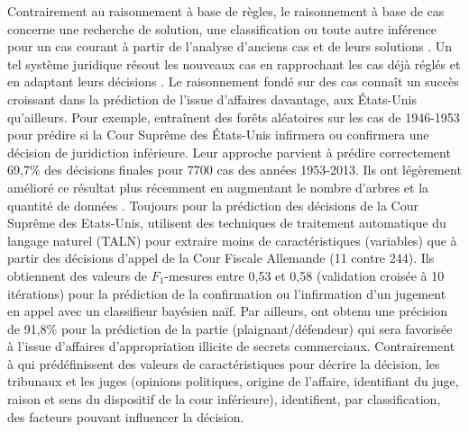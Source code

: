Contrairement au raisonnement à base de règles, le raisonnement à base de cas concerne une recherche de solution, une classification ou toute autre inférence pour un cas courant à partir de l'analyse d'anciens cas et de leurs solutions \citep{moens2002case-basedreasoning}. Un tel système juridique résout les nouveaux cas en rapprochant les cas déjà réglés et en adaptant leurs décisions \citep{Berka2011rbr-cbr}. Le raisonnement fondé sur des cas connaît un succès croissant dans la prédiction de l'issue d'affaires davantage, aux États-Unis qu'ailleurs. Pour exemple, \citet{katz2014predicting} entraînent des forêts aléatoires \citep{breiman2001randomforest} sur les cas de 1946-1953 pour prédire si la Cour Suprême des États-Unis infirmera ou confirmera une décision de juridiction inférieure. Leur approche parvient à prédire correctement 69,7\% des décisions finales pour 7700 cas des années 1953-2013. Ils ont légèrement amélioré ce résultat plus récemment en augmentant le nombre d'arbres et la quantité de données \citep{katz2017predictsupremecourt}. Toujours pour la prédiction des décisions de la Cour Suprême des Etats-Unis, \citet{waltl2017predictgermantaxlaw} utilisent des techniques de traitement automatique du langage naturel (TALN) pour extraire moins de caractéristiques (variables) que \citep{katz2014predicting}  à partir des décisions d'appel de la Cour Fiscale Allemande (11 contre 244). Ils obtiennent des valeurs de $F_1$-mesures entre 0,53 et 0,58 (validation croisée à 10 itérations) pour la prédiction  de la confirmation ou l'infirmation d'un jugement en appel avec un classifieur bayésien naïf.  Par ailleurs, \cite{Ashley2009classifCases} ont obtenu une précision de 91,8\% pour la prédiction de la partie (plaignant/défendeur)  qui sera favorisée à l'issue d'affaires d'appropriation illicite de secrets commerciaux. Contrairement à \citet{katz2014predicting} qui prédéfinissent des valeurs de caractéristiques pour décrire la décision, les tribunaux et les juges (opinions politiques, origine de l'affaire, identifiant du juge, raison et sens du dispositif de la cour inférieure), \cite{Ashley2009classifCases} identifient, par classification, des facteurs pouvant influencer la décision.%

